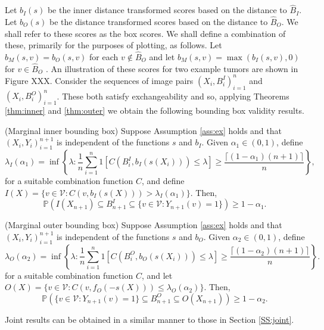 Let $b_I(s)$ be the inner distance transformed scores based on the distance to $\hat{B}_I$. Let $b_O(s)$ be the distance transformed scores based on the distance to $\hat{B}_O$. We shall refer to these scores as the box scores. We shall define a combination of these, primarily for the purposes of plotting, as follows. Let $b_M(s, v) = b_O(s,v)$ for each $v \not\in \hat{B}_O$ and let $b_M(s, v) = \max(b_I(s,v), 0) $ for $v \in \hat{B}_O$ . An illustration of these scores for two example tumors are shown in Figure XXX. Consider the sequences of image pairs $(X_i, B_i^I)_{i = 1}^n$ and $(X_i, B_i^O)_{i = 1}^n$. These both satisfy exchangeability and so, applying Theorems \ref{thm:inner} and \ref{thm:outer} we obtain the following bounding box validity results.
\begin{corollary}\label{thm:boxinnergen}
	(Marginal inner bounding box)
	Suppose Assumption \ref{ass:ex} holds and that $(X_i, Y_i)_{i = 1}^{n+1}$ is independent of the functions $s$ and $b_I$.  Given $\alpha_1 \in (0,1)$, define 
	\begin{equation*}
		\lambda_I(\alpha_1) = \inf\left\lbrace \lambda: \frac{1}{n} \sum_{i = 1}^n 1\left[ C(B^I_i, b_I(s(X_i))) \leq \lambda \right] \geq  \frac{\lceil (1-\alpha_1)(n+1) \rceil}{n} \right\rbrace,
	\end{equation*}
	for a suitable combination function $C$, and define $I(X) = \lbrace v \in \mathcal{V}: C(v, b_I(s(X))) >\lambda_I(\alpha_1)  \rbrace $. Then,
	\begin{equation}\label{eq:probstat}
		\mathbb{P}\left( I(X_{n+1}) \subseteq B^I_{n+1} \subseteq\lbrace v\in \mathcal{V}: Y_{n+1}(v) = 1 \rbrace \right) \geq 1 - \alpha_1.
	\end{equation}
\end{corollary}
\begin{corollary}\label{thm:boxgenouter}
	(Marginal outer bounding box)
	Suppose Assumption \ref{ass:ex} holds and that $(X_i, Y_i)_{i = 1}^{n+1}$ is independent of the functions $s$ and $b_O$. Given $\alpha_2 \in (0,1)$, define 
	\begin{equation*}
		\lambda_O({\alpha_2})= \inf\left\lbrace \lambda: \frac{1}{n} \sum_{i = 1}^n 1\left[ C(B^O_i, b_O(s(X_i))) \leq \lambda \right] \geq  \frac{\lceil (1-\alpha_2)(n+1) \rceil}{n} \right\rbrace.
	\end{equation*}
	for a suitable combination function $C$, and let $O(X) = \lbrace v \in \mathcal{V}: C(v, f_O(-s(X))) \leq \lambda_O(\alpha_2)  \rbrace $. Then,
	\begin{equation}\label{eq:probstat}
		\mathbb{P}\left( \lbrace v\in \mathcal{V}: Y_{n+1}(v) = 1 \rbrace \subseteq B^O_{n+1} \subseteq O(X_{n+1}) \right) \geq 1 - \alpha_2.
	\end{equation}
\end{corollary}
Joint results can be obtained in a similar manner to those in Section \ref{SS:joint}.

